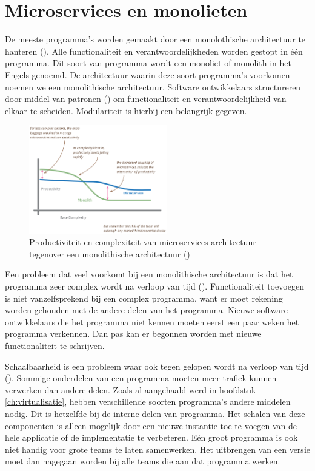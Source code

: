 \chapter{Microservices en monolieten}
\label{ch:microservices}

De meeste programma's worden gemaakt door een monolothische architectuur te hanteren (\cite{villamizar_evaluating_2015}). Alle functionaliteit en verantwoordelijkheden worden gestopt in één programma. Dit soort van programma wordt een monoliet of monolith in het Engels genoemd. De architectuur waarin deze soort programma's voorkomen noemen we een monolithische architectuur. Software ontwikkelaars structureren door middel van patronen (\cite{tichy_catalogue_1997}) om functionaliteit en verantwoordelijkheid van elkaar te scheiden. Modulariteit is hierbij een belangrijk gegeven.

\begin{figure}
    \centering
    \includegraphics[width=6cm]{img/microservices_monolith}
    \caption[Vergelijking microservices en monolieten]{Productiviteit en complexiteit van microservices architectuur tegenover een monolithische architectuur (\cite{martin_fowler_microservicepremium_2015})}
    \label{fig:pr}
\end{figure}

Een probleem dat veel voorkomt bij een monolithische architectuur is dat het programma zeer complex wordt na verloop van tijd (\cite{villamizar_evaluating_2015}). Functionaliteit toevoegen is niet vanzelfsprekend bij een complex programma, want er moet rekening worden gehouden met de andere delen van het programma. Nieuwe software ontwikkelaars die het programma niet kennen moeten eerst een paar weken het programma verkennen. Dan pas kan er begonnen worden met nieuwe functionaliteit te schrijven.

Schaalbaarheid is een probleem waar ook tegen gelopen wordt na verloop van tijd (\cite{villamizar_evaluating_2015}). Sommige onderdelen van een programma moeten meer trafiek kunnen verwerken dan andere delen. Zoals al aangehaald werd in hoofdstuk \ref{ch:virtualisatie}, hebben verschillende soorten programma's andere middelen nodig. Dit is hetzelfde bij de interne delen van programma. Het schalen van deze componenten is alleen mogelijk door een nieuwe instantie toe te voegen van de hele applicatie of de implementatie te verbeteren. Eén groot programma is ook niet handig voor grote teams te laten samenwerken. Het uitbrengen van een versie moet dan nagegaan worden bij alle teams die aan dat programma werken.

